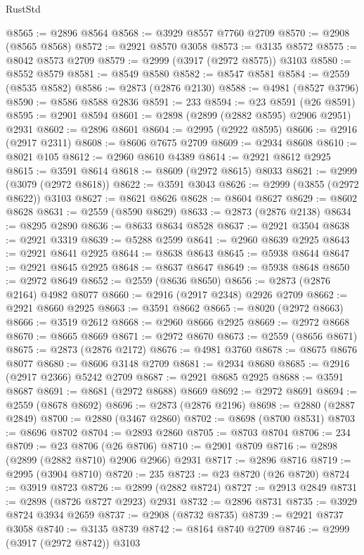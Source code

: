 \begin{lexlean}{RustStd}
\begin{coremodule}
@8565 := @2896 @8564
@8568 := @3929 @8557 @7760 @2709
@8570 := @2908 (@8565 @8568)
@8572 := @2921 @8570 @3058
@8573 := @3135 @8572
@8575 := @8042 @8573 @2709
@8579 := @2999 (@3917 (@2972 @8575)) @3103
@8580 := @8552 @8579
@8581 := @8549 @8580
@8582 := @8547 @8581
@8584 := @2559 (@8535 @8582)
@8586 := @2873 (@2876 @2130)
@8588 := @4981 (@8527 @3796)
@8590 := @8586 @8588 @2836
@8591 := 233
@8594 := @23 @8591 (@26 @8591)
@8595 := @2901 @8594
@8601 := @2898 (@2899 (@2882 @8595) @2906 @2951) @2931
@8602 := @2896 @8601
@8604 := @2995 (@2922 @8595)
@8606 := @2916 (@2917 @2311)
@8608 := @8606 @7675 @2709
@8609 := @2934 @8608
@8610 := @8021 @105
@8612 := @2960 @8610 @4389
@8614 := @2921 @8612 @2925
@8615 := @3591 @8614
@8618 := @8609 (@2972 @8615) @8033
@8621 := @2999 (@3079 (@2972 @8618))
@8622 := @3591 @3043
@8626 := @2999 (@3855 (@2972 @8622)) @3103
@8627 := @8621 @8626
@8628 := @8604 @8627
@8629 := @8602 @8628
@8631 := @2559 (@8590 @8629)
@8633 := @2873 (@2876 @2138)
@8634 := @8295 @2890
@8636 := @8633 @8634 @8528
@8637 := @2921 @3504
@8638 := @2921 @3319
@8639 := @5288 @2599
@8641 := @2960 @8639 @2925
@8643 := @2921 @8641 @2925
@8644 := @8638 @8643
@8645 := @5938 @8644
@8647 := @2921 @8645 @2925
@8648 := @8637 @8647
@8649 := @5938 @8648
@8650 := @2972 @8649
@8652 := @2559 (@8636 @8650)
@8656 := @2873 (@2876 @2164) @4982 @8077
@8660 := @2916 (@2917 @2348) @2926 @2709
@8662 := @2921 @8660 @2925
@8663 := @3591 @8662
@8665 := @8020 (@2972 @8663)
@8666 := @3519 @2612
@8668 := @2960 @8666 @2925
@8669 := @2972 @8668
@8670 := @8665 @8669
@8671 := @2972 @8670
@8673 := @2559 (@8656 @8671)
@8675 := @2873 (@2876 @2172)
@8676 := @4981 @3760
@8678 := @8675 @8676 @8077
@8680 := @8606 @3148 @2709
@8681 := @2934 @8680
@8685 := @2916 (@2917 @2366) @5242 @2709
@8687 := @2921 @8685 @2925
@8688 := @3591 @8687
@8691 := @8681 (@2972 @8688) @8669
@8692 := @2972 @8691
@8694 := @2559 (@8678 @8692)
@8696 := @2873 (@2876 @2196)
@8698 := @2880 (@2887 @2849)
@8700 := @2880 (@3467 @2860)
@8702 := @8698 (@8700 @8531)
@8703 := @8696 @8702
@8704 := @2893 @2860
@8705 := @8703 @8704
@8706 := 234
@8709 := @23 @8706 (@26 @8706)
@8710 := @2901 @8709
@8716 := @2898 (@2899 (@2882 @8710) @2906 @2966) @2931
@8717 := @2896 @8716
@8719 := @2995 (@3904 @8710)
@8720 := 235
@8723 := @23 @8720 (@26 @8720)
@8724 := @3919 @8723
@8726 := @2899 (@2882 @8724)
@8727 := @2913 @2849
@8731 := @2898 (@8726 @8727 @2923) @2931
@8732 := @2896 @8731
@8735 := @3929 @8724 @3934 @2659
@8737 := @2908 (@8732 @8735)
@8739 := @2921 @8737 @3058
@8740 := @3135 @8739
@8742 := @8164 @8740 @2709
@8746 := @2999 (@3917 (@2972 @8742)) @3103

\end{coremodule}
\end{lexlean}
